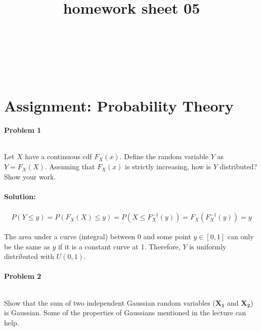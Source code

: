 \documentclass{article}
\title{homework sheet 05}
\author{
\name{Andre Seitz}\\
\imat{03622870}\\
\email{andre.seitz@mytum.de}
\And
\name{Linda Leidig} \\
\imat{03608416}\\
\email{linda.leidig@tum.de}
}
\renewcommand{\Vec}[1]{\ensuremath{\mathbf{#1}}}
\begin{document}
\maketitle

\section{Assignment: Probability Theory}
\paragraph*{Problem 1}
$\;$ 

Let $X$ have a continuous cdf $F_X(x)$. Define the
random variable $Y$ as $Y = F_X(X)$. Assuming that
$F_X(x)$ is strictly increasing, how is $Y$ distributed?
Show your work.

\paragraph*{Solution:}
\begin{eqnarray}
P(Y \leq y) = P(F_X(X) \leq y) = P(X \leq F^{-1}_X(y)) = F_X(F_X^{-1}(y)) = y
\end{eqnarray}

The area under a curve (integral) between 0 and some point $y \in [0,1]$ can only be the same as $y$ if it is a constant curve at 1. Therefore, $Y$ is uniformly distributed with $U(0,1)$.

\paragraph*{Problem 2}
$\;$ 

Show that the sum of two independent Gaussian random variables ($\Vec{X_1}$ and $\Vec{X_2}$) is Gaussian. Some of the properties of Gaussians mentioned in the lecture can help.
\end{document}
